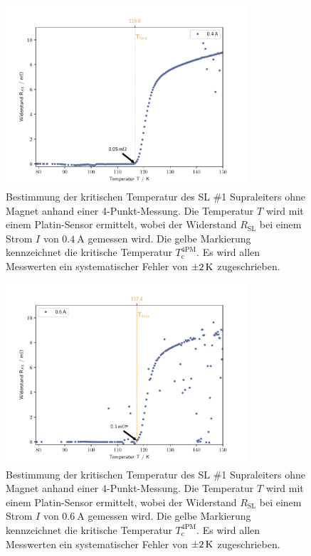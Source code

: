 \begin{figure}[H]
    \centering
    \includegraphics[width=0.8\textwidth]{Auswertung/I_krit_Pt/R_T_0.4A.pdf}
    \caption{Bestimmung der kritischen Temperatur des SL \#1 Supraleiters ohne Magnet
    anhand einer 4-Punkt-Messung. Die Temperatur $T$ wird mit einem Platin-Sensor
    ermittelt, wobei der Widerstand $R_{\text{SL}}$ bei einem Strom $I$ von
    $\SI{0.4}{\ampere}$ gemessen wird.
		Die gelbe Markierung kennzeichnet die kritische Temperatur	$T^{\text{4PM}}_{\text{c}}$.
		Es wird allen Messwerten ein systematischer Fehler von $\SI{\pm2}{\kelvin}$
		zugeschrieben.}
    \label{fig:Ic1.2}
\end{figure}

\begin{figure}[H]
    \centering
    \includegraphics[width=0.8\textwidth]{Auswertung/I_krit_Pt/R_T_0.6A.pdf}
    \caption{Bestimmung der kritischen Temperatur des SL \#1 Supraleiters ohne Magnet
    anhand einer 4-Punkt-Messung. Die Temperatur $T$ wird mit einem Platin-Sensor
    ermittelt, wobei der Widerstand $R_{\text{SL}}$ bei einem Strom $I$ von
    $\SI{0.6}{\ampere}$ gemessen wird.
		Die gelbe Markierung kennzeichnet die kritische Temperatur	$T^{\text{4PM}}_{\text{c}}$.
		Es wird allen Messwerten ein systematischer Fehler von $\SI{\pm2}{\kelvin}$
		zugeschrieben.}
    \label{fig:Ic1.3}
\end{figure}

